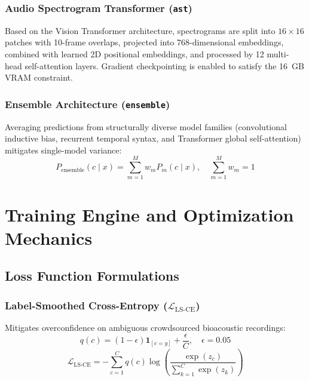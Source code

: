 \documentclass[11pt,a4paper]{article}
\begin{document}
\subsubsection{Audio Spectrogram Transformer (\texttt{ast})}
Based on the Vision Transformer architecture, spectrograms are split into $16 \times 16$ patches with 10-frame overlaps, projected into 768-dimensional embeddings, combined with learned 2D positional embeddings, and processed by 12 multi-head self-attention layers. Gradient checkpointing is enabled to satisfy the 16~GB VRAM constraint.

\subsubsection{Ensemble Architecture (\texttt{ensemble})}
Averaging predictions from structurally diverse model families (convolutional inductive bias, recurrent temporal syntax, and Transformer global self-attention) mitigates single-model variance:
\begin{equation}
    P_{\text{ensemble}}(c \mid x) = \sum_{m=1}^M w_m P_m(c \mid x), \quad \sum_{m=1}^M w_m = 1
\end{equation}

\section{Training Engine and Optimization Mechanics}

\subsection{Loss Function Formulations}

\subsubsection{\texorpdfstring{Label-Smoothed Cross-Entropy ($\mathcal{L}_{\text{LS-CE}}$)}{Label-Smoothed Cross-Entropy}}
Mitigates overconfidence on ambiguous crowdsourced bioacoustic recordings:
\begin{equation}
    q(c) = (1 - \epsilon) \mathbf{1}_{[c = y]} + \frac{\epsilon}{C}, \quad \epsilon = 0.05
\end{equation}
\begin{equation}
    \mathcal{L}_{\text{LS-CE}} = - \sum_{c=1}^C q(c) \log \left( \frac{\exp(z_c)}{\sum_{k=1}^C \exp(z_k)} \right)
\end{equation}
\end{document}
